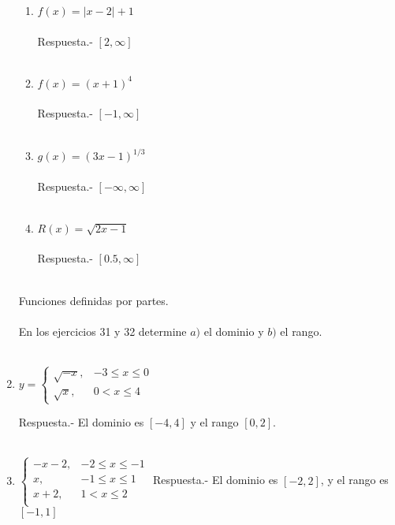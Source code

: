 \begin{enumerate}
\begin{enumerate}[\bfseries a)]
    \item $f(x) = |x-2|+1$\\\\
	Respuesta.-\; $[2,\infty]$\\\\

    \item $f(x) = (x+1)^4$\\\\
	Respuesta.-\; $[-1,\infty]$\\\\

    \item $g(x) = (3x-1)^{1/3}$\\\\
	Respuesta.-\; $[-\infty,\infty]$\\\\

    \item $R(x) = \sqrt{2x-1}$\\\\
	Respuesta.-\; $[0.5,\infty]$\\\\

\end{enumerate}

Funciones definidas por partes.\\\\
En los ejercicios 31 y 32 determine $a)$ el dominio y $b)$ el rango.\\\\

\item $y=\left\{\begin{array}{rl}
	\sqrt{-x},&-3\leq x \leq 0\\
	\sqrt{x},&0<x\leq 4
    \end{array}\right.$\\
    \vspace{.3cm}

    Respuesta.-\; El dominio es $[-4,4]$ y el rango $[0,2]$.\\\\

\item $\left\{\begin{array}{rl}
	-x-2,&-2\leq x \leq -1\\
	x,&-1\leq x \leq 1\\
	x+2,&1<x\leq 2\\
    \end{array}\right.$
    \vspace{.3cm}
    Respuesta.-\; El dominio es $[-2,2]$, y el rango es $[-1,1]$\\\\


\end{enumerate}
